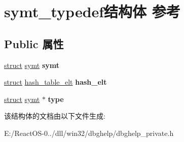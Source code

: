 \hypertarget{structsymt__typedef}{}\section{symt\+\_\+typedef结构体 参考}
\label{structsymt__typedef}
\subsection*{Public 属性}
\begin{DoxyCompactItemize}
\item 
\mbox{\label{structsymt__typedef_aaf83defd0aefb5abb17da9d4ea41aca9}} 
\hyperlink{interfacestruct}{struct} \hyperlink{structsymt}{symt} {\bfseries symt}
\item 
\mbox{\label{structsymt__typedef_a73d88d47eba76d6f00930d01fcaf9a91}} 
\hyperlink{interfacestruct}{struct} \hyperlink{structhash__table__elt}{hash\+\_\+table\+\_\+elt} {\bfseries hash\+\_\+elt}
\item 
\mbox{\label{structsymt__typedef_afec5b34635db032dfe195f6e02273a1d}} 
\hyperlink{interfacestruct}{struct} \hyperlink{structsymt}{symt} $\ast$ {\bfseries type}
\end{DoxyCompactItemize}


该结构体的文档由以下文件生成\+:\begin{DoxyCompactItemize}
\item 
E\+:/\+React\+O\+S-\/0../dll/win32/dbghelp/dbghelp\+\_\+private.\+h\end{DoxyCompactItemize}
